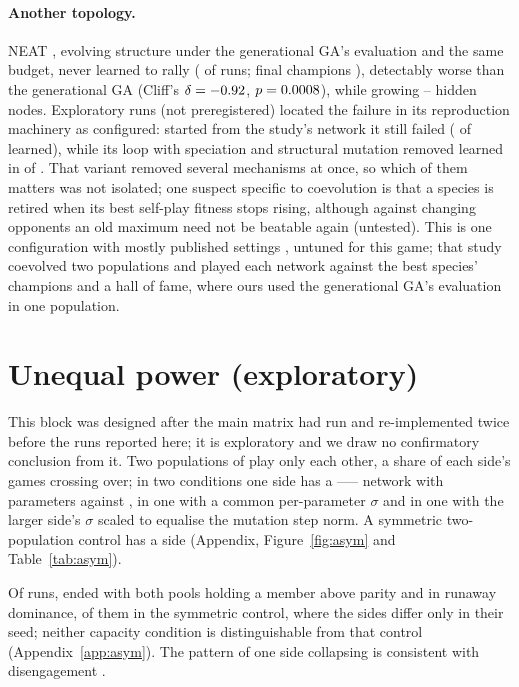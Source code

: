 \documentclass[11pt]{article}
\begin{document}
\paragraph{Another topology.} NEAT \citep{stanley2002evolving}, evolving
structure under the generational GA's evaluation and the same budget, never
learned to rally (\nNeatLearned{} of \nNeatRuns{} runs; final champions
\nNeatFinal), detectably worse than the generational GA (Cliff's
$\delta=-0.92$, $p=0.0008$), while growing
\nNeatHiddenMin--\nNeatHiddenMax{} hidden nodes. Exploratory runs (not
preregistered) located the failure in its reproduction machinery as
configured: started from the study's network it still failed
(\nNxMlpLearned{} of \nNxRuns{} learned), while its loop with speciation and
structural mutation removed learned in \nNxAsgaLearned{} of \nNxRuns. That
variant removed several mechanisms at once, so which of them matters was not
isolated; one suspect specific to coevolution is that a species is retired
when its best self-play fitness stops rising, although against changing
opponents an old maximum need not be beatable again (untested). This is one
configuration with mostly published settings \citep{stanley2004competitive},
untuned for this game; that study coevolved two populations and played each
network against the best species' champions and a hall of fame, where ours
used the generational GA's evaluation in one population.

\section{Unequal power (exploratory)}
\label{sec:asym}

This block was designed after the main matrix had run and re-implemented twice
before the runs reported here; it is exploratory and we draw no confirmatory
conclusion from it. Two populations of \nPop{} play only each other, a share
\nAsymCross{} of each side's games crossing over; in two conditions one side
has a \nObsSize--\nHiddenLarge--\nHiddenLarge--\nNAct{} network with
\nAsymParamLarge{} parameters against \nParamCount, in one with a common per-parameter
$\sigma$ and in one with the larger side's $\sigma$ scaled to equalise the
mutation step norm. A symmetric two-population control has \nParamCount{} a side
(Appendix, Figure~\ref{fig:asym} and Table~\ref{tab:asym}).

Of \nAsymRuns{} runs, \nAsymMutual{} ended with both pools holding a member
above parity and \nAsymRunaway{} in runaway dominance, \nAsymRunawaySym{} of them in the
symmetric control, where the sides differ only in their seed; neither capacity
condition is distinguishable from that control (Appendix~\ref{app:asym}). The
pattern of one side collapsing is consistent with disengagement
\citep{cartlidge2004combating}.
\end{document}
